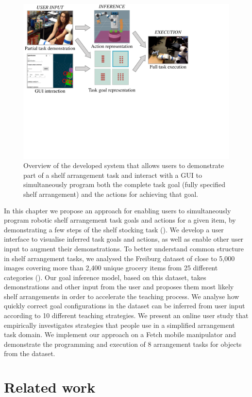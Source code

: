 \begin{figure}[h]
	\centering
	\includegraphics[width=0.85\linewidth]{figures/iros-overview}
	\caption{Overview of the developed system that allows users to demonstrate part of a shelf arrangement task and interact with a GUI to simultaneously program both the complete task goal (fully specified shelf arrangement) and the actions for achieving that goal.}
	\label{fig:irosoverview}
\end{figure}


In this chapter we propose an approach for enabling users to simultaneously program robotic shelf arrangement task goals and actions for a given item, by demonstrating a few steps of the shelf stocking task (). 
We develop a user interface to visualise inferred task goals and actions, as well as enable other user input to augment their demonstrations. 
To better understand common structure in shelf arrangement tasks, we analysed the Freiburg dataset of close to 5,000 images covering more than 2,400 unique grocery items from 25 different categories (\cite{jund2016freiburg}). 
Our goal inference model, based on this dataset, takes demonstrations and other input from the user and proposes them most likely shelf arrangements in order to accelerate the teaching process.
We analyse how quickly correct goal configurations in the dataset can be inferred from user input according to 10 different teaching strategies.
We present an online user study that empirically investigates strategies that people use in a simplified arrangement task domain.
We implement our approach on a Fetch mobile manipulator and demonstrate the programming and execution of 8 arrangement tasks for objects from the dataset.

\section{Related work}
\label{sec:irosrelatedwork}

